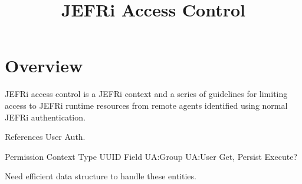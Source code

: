 \documentclass{article}
\begin{document}
\title{JEFRi Access Control}
\maketitle
\tableofcontents
\newpage
\linespread{1.6}

\section{Overview}
JEFRi access control is a JEFRi context and a series of guidelines for limiting
access to JEFRi runtime resources from remote agents identified using normal
JEFRi authentication.

References User Auth.

Permission
	Context
		Type
			UUID
				Field
	UA:Group
		UA:User
	Get, Persist
	Execute?

Need efficient data structure to handle these entities.
\end{document}
